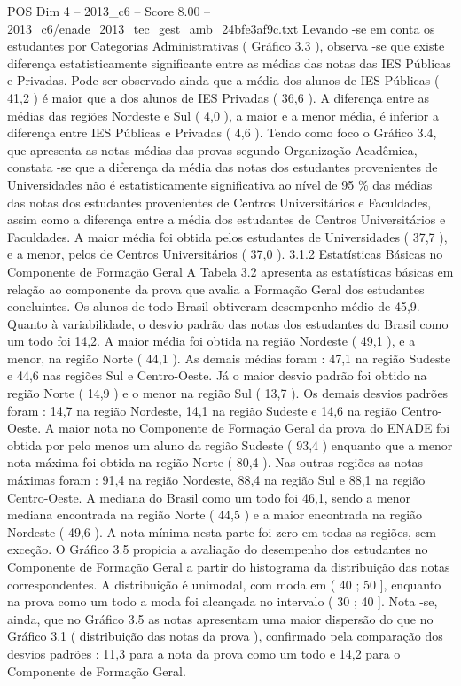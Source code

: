 \begin{textsample}{POS Dim 4 – 2013\_c6 – Score 8.00 – 2013\_c6/enade\_2013\_tec\_gest\_amb\_24bfe3af9c.txt}
Levando -se em conta os estudantes por Categorias Administrativas ( Gráfico 3.3 ), observa -se que existe diferença estatisticamente significante entre as médias das notas das IES Públicas e Privadas.
Pode ser observado ainda que a média dos alunos de IES Públicas ( 41,2 ) é maior que a dos alunos de IES Privadas ( 36,6 ).
A diferença entre as médias das regiões Nordeste e Sul ( 4,0 ), a maior e a menor média, é inferior a diferença entre IES Públicas e Privadas ( 4,6 ).
Tendo como foco o Gráfico 3.4, que apresenta as notas médias das provas segundo Organização Acadêmica, constata -se que a diferença da média das notas dos estudantes provenientes de Universidades não é estatisticamente significativa ao nível de 95 \% das médias das notas dos estudantes provenientes de Centros Universitários e Faculdades, assim como a diferença entre a média dos estudantes de Centros Universitários e Faculdades.
A maior média foi obtida pelos estudantes de Universidades ( 37,7 ), e a menor, pelos de Centros Universitários ( 37,0 ). 3.1.2 Estatísticas Básicas no Componente de Formação Geral A Tabela 3.2 apresenta as estatísticas básicas em relação ao componente da prova que avalia a Formação Geral dos estudantes concluintes.
Os alunos de todo Brasil obtiveram desempenho médio de 45,9.
Quanto à variabilidade, o desvio padrão das notas dos estudantes do Brasil como um todo foi 14,2.
A maior média foi obtida na região Nordeste ( 49,1 ), e a menor, na região Norte ( 44,1 ).
As demais médias foram : 47,1 na região Sudeste e 44,6 nas regiões Sul e Centro-Oeste.
Já o maior desvio padrão foi obtido na região Norte ( 14,9 ) e o menor na região Sul ( 13,7 ).
Os demais desvios padrões foram : 14,7 na região Nordeste, 14,1 na região Sudeste e 14,6 na região Centro-Oeste.
A maior nota no Componente de Formação Geral da prova do ENADE foi obtida por pelo menos um aluno da região Sudeste ( 93,4 ) enquanto que a menor nota máxima foi obtida na região Norte ( 80,4 ).
Nas outras regiões as notas máximas foram : 91,4 na região Nordeste, 88,4 na região Sul e 88,1 na região Centro-Oeste.
A mediana do Brasil como um todo foi 46,1, sendo a menor mediana encontrada na região Norte ( 44,5 ) e a maior encontrada na região Nordeste ( 49,6 ).
A nota mínima nesta parte foi zero em todas as regiões, sem exceção.
O Gráfico 3.5 propicia a avaliação do desempenho dos estudantes no Componente de Formação Geral a partir do histograma da distribuição das notas correspondentes.
A distribuição é unimodal, com moda em ( 40 ; 50 ], enquanto na prova como um todo a moda foi alcançada no intervalo ( 30 ; 40 ].
Nota -se, ainda, que no Gráfico 3.5 as notas apresentam uma maior dispersão do que no Gráfico 3.1 ( distribuição das notas da prova ), confirmado pela comparação dos desvios padrões : 11,3 para a nota da prova como um todo e 14,2 para o Componente de Formação Geral.

\end{textsample}
